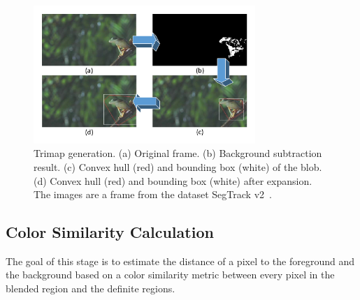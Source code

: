 \begin{figure}
	\centering
	\includegraphics[width=3.3in]{figures/trimap.pdf}
	\caption{Trimap generation. (a) Original frame. (b) Background subtraction result. (c) Convex hull (red) and bounding box (white) of the blob. (d) Convex hull (red) and bounding box (white) after expansion. The images are a frame from the dataset SegTrack v2~\cite{f-li2013}.}
	\label{fig-trimap}
\end{figure}

\subsection{Color Similarity Calculation}
\label{method-csc}

The goal of this stage is to estimate the distance of a pixel to the foreground and the background based on a color similarity metric between every pixel in the blended region and the definite regions.

